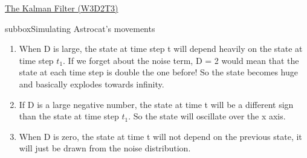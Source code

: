 \begin{textbox}{\href{http://instructor.compneuro.neuromatch.io/tutorials/W3D2_HiddenDynamics/instructor/W3D2_Tutorial3.html}{The Kalman Filter (W3D2T3)}   }
\begin{subbox}{subbox}{Simulating Astrocat's movements}
\begin{enumerate}
    \item 
When D is large, the state at time step t will depend heavily on the state at time
   step $t_1$. If we forget about the noise term, D = 2 would mean that the state at each
   time step is double the one before! So the state becomes huge and basically explodes towards
   infinity.

\item If D is a large negative number, the state at time t will be a different sign than the
   state at time step $t_1$. So the state will oscillate over the x axis.

\item When D is zero, the state at time t will not depend on the previous state, it will just
   be drawn from the noise distribution.
   \end{enumerate} 
\end{subbox}

\end{textbox}
